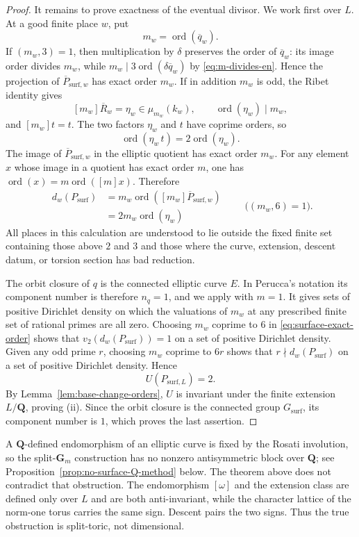\documentclass[11pt,letterpaper,reqno]{amsart}
\theoremstyle{definition}
\theoremstyle{remark}
\newcommand{\Gm}{\mathbf G_m}
\newcommand{\Q}{\mathbf Q}
\newcommand{\ord}{\operatorname{ord}}
\begin{document}
\begin{proof}
It remains to prove exactness of the eventual divisor.  We work first over
$L$.  At a good finite place $w$, put
\[
 m_w=\ord(\overline q_w).
\]
If $(m_w,3)=1$, then multiplication by $\delta$ preserves the order of
$\overline q_w$: its image order divides $m_w$, while
$m_w\mid3\ord(\delta\overline q_w)$ by \eqref{eq:m-divides-en}.  Hence the
projection of $\overline P_{\mathrm{surf},w}$ has exact order $m_w$.
If in addition $m_w$ is odd, the Ribet identity gives
\[
 [m_w]\overline R_w=\eta_w\in\mu_{m_w}(k_w),
 \qquad \ord(\eta_w)\mid m_w,
\]
and $[m_w]t=t$.  The two factors $\eta_w$ and $t$ have coprime orders, so
\[
 \ord(\eta_w\,t)=2\ord(\eta_w).
\]
The image of $\overline P_{\mathrm{surf},w}$ in the elliptic quotient has
exact order $m_w$.  For any element $x$ whose image in a quotient has exact
order $m$, one has $\ord(x)=m\ord([m]x)$.  Therefore
\begin{equation}\label{eq:surface-exact-order}
 \begin{aligned}
 d_w(P_{\mathrm{surf}})
 &=m_w\ord\!\left([m_w]\overline P_{\mathrm{surf},w}\right)\\
 &=2m_w\ord(\eta_w)
 \end{aligned}
 \qquad\bigl((m_w,6)=1\bigr).
\end{equation}
All places in this calculation are understood to lie outside the fixed finite
set containing those above $2$ and $3$ and those where the curve, extension,
descent datum, or torsion section has bad reduction.

The orbit closure of $q$ is the connected elliptic curve $E$.  In Perucca's
notation its component number is therefore $n_q=1$, and we apply
\cite[Main Theorem~1]{Perucca2009} with $m=1$.  It gives sets of positive
Dirichlet density on which the valuations of $m_w$ at any prescribed finite
set of rational primes are all zero.  Choosing $m_w$ coprime to $6$
in \eqref{eq:surface-exact-order} shows that
$v_2(d_w(P_{\mathrm{surf}}))=1$ on a set of positive Dirichlet density.  Given any odd
prime $r$, choosing $m_w$ coprime to $6r$ shows that
$r\nmid d_w(P_{\mathrm{surf}})$ on a set of positive Dirichlet density.  Hence
\[
 U(P_{\mathrm{surf},L})=2.
\]
By Lemma~\ref{lem:base-change-orders}, $U$ is invariant under the finite extension
$L/\Q$, proving (ii).  Since the orbit closure is the connected group
$G_{\mathrm{surf}}$, its component number is $1$, which proves the last
assertion.
\end{proof}


A $\Q$-defined endomorphism of an elliptic curve is fixed by the Rosati
involution, so the split-$\Gm$ construction has no nonzero antisymmetric block
over $\Q$; see Proposition~\ref{prop:no-surface-Q-method} below.  The theorem above does not
contradict that obstruction.  The endomorphism $[\omega]$ and the extension
class are defined only over $L$ and are both anti-invariant, while the
character lattice of the norm-one torus carries the same sign.  Descent pairs
the two signs.  Thus the true obstruction is split-toric, not dimensional.
\end{document}

